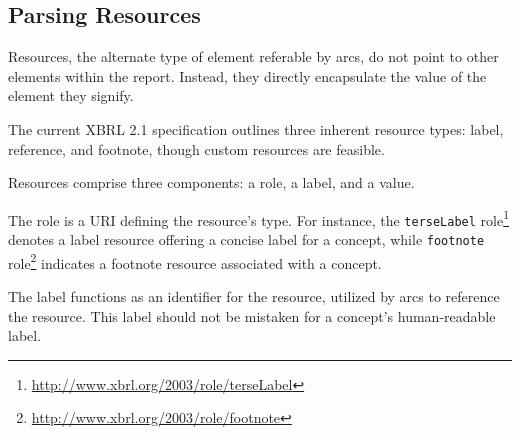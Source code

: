 





\subsection{Parsing Resources}

Resources, the alternate type of element referable by arcs, do not point to other elements within the report.
Instead, they directly encapsulate the value of the element they signify.

The current XBRL 2.1 specification outlines three inherent resource types: label, reference, and footnote, though custom resources are feasible.

Resources comprise three components: a role, a label, and a value.

The role is a URI defining the resource's type.
For instance, the \texttt{terseLabel} role\footnote{\url{http://www.xbrl.org/2003/role/terseLabel}} 
denotes a label resource offering a concise label for a concept,
while \texttt{footnote} role\footnote{\url{http://www.xbrl.org/2003/role/footnote}}
indicates a footnote resource associated with a concept.

The label functions as an identifier for the resource, utilized by arcs to reference the resource.
This label should not be mistaken for a concept's human-readable label.

